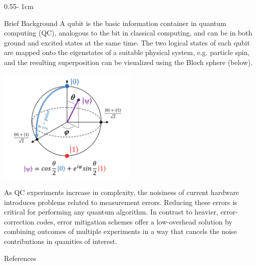 \documentclass{../psuposter}
\begin{document}
\begin{frame}
\begin{columns}[t, totalwidth=\textwidth]
\begin{column}{0.55\textwidth - 1cm}
    \begin{block}{Brief Background}
        A qubit is the  basic information container in quantum computing (QC), analogous to the bit in classical computing, and can be in both ground and excited states at the same time. The two logical states of each qubit are mapped onto the eigenstates of a suitable physical system, e.g. particle spin, and the resulting superposition can be visualized using the Bloch sphere (below). \cite{jazaeriReviewQuantumComputing2019}

        \begin{center}
		   	\includegraphics[width=0.5\textwidth]{images/bloch}    		
    	\end{center}
        
		As QC experiments increase in complexity, the noisiness of current hardware introduces problems related to measurement errors. Reducing these errors is critical for performing any quantum algorithm. In contrast to heavier, error-correction codes, error mitigation schemes offer a low-overhead solution by combining outcomes of multiple experiments in a way that cancels the noise contributions in quanities of interest. \cite{bravyiMitigatingMeasurementErrors2020}

    \end{block}


    \begin{block}{References}
        
%        
		
    \end{block}

\end{column}
\end{columns}



\end{frame}
\end{document}
